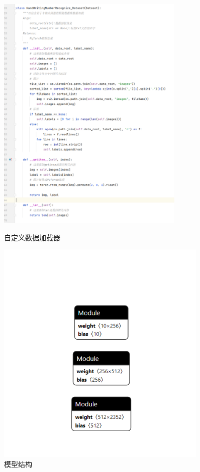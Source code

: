 \documentclass{report}
\begin{document}
	\begin{figure}[htbp]
		\centering
		\begin{minipage}[t]{0.60\textwidth}
			\centering
			\centering
			\includegraphics[width=0.8\textwidth]{fig/fig4.png}
			\caption{自定义数据加载器}
			\label{fig:data}
		\end{minipage}
		\hfill
		\begin{minipage}[t]{0.38\textwidth}
			\centering
			\includegraphics[width=0.9\textwidth]{fig/fig2.png}
			\caption{模型结构}
			\label{fig:model}
		\end{minipage}
	\end{figure}
\end{document}
